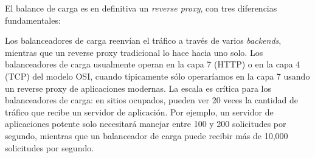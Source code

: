 El balance de carga es en definitiva un \textit{reverse proxy}, con tres diferencias fundamentales: 
\begin{outline}
\1 Los balanceadores de carga reenvían el tráfico a través de varios \textit{backends}, mientras que un reverse proxy tradicional lo hace hacia uno solo.
\1 Los balanceadores de carga usualmente operan en la capa 7 (HTTP) o en la capa 4 (TCP) del modelo OSI, cuando típicamente sólo operaríamos en la capa 7 usando un reverse proxy de aplicaciones modernas.
\1 La escala es crítica para los balanceadores de carga: en sitios ocupados, pueden ver 20 veces la cantidad de tráfico que recibe un servidor de aplicación. Por ejemplo, un servidor de aplicaciones potente solo necesitará manejar entre 100 y 200 solicitudes por segundo, mientras que un balanceador de carga puede recibir más de 10,000 solicitudes por segundo.
\end{outline}
